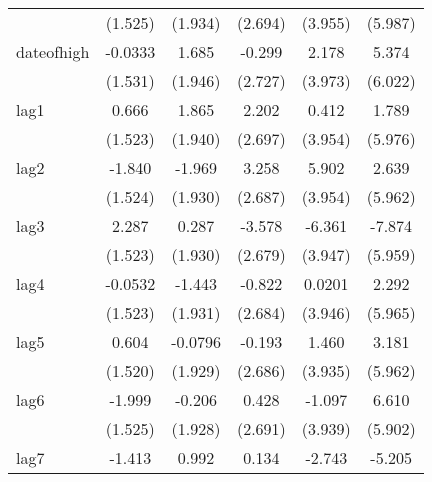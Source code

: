 {\begin{tabular}{l*{5}{c}}
            &     (1.525)         &     (1.934)         &     (2.694)         &     (3.955)         &     (5.987)         \\
[1em]
dateofhigh  &     -0.0333         &       1.685         &      -0.299         &       2.178         &       5.374         \\
            &     (1.531)         &     (1.946)         &     (2.727)         &     (3.973)         &     (6.022)         \\
[1em]
lag1        &       0.666         &       1.865         &       2.202         &       0.412         &       1.789         \\
            &     (1.523)         &     (1.940)         &     (2.697)         &     (3.954)         &     (5.976)         \\
[1em]
lag2        &      -1.840         &      -1.969         &       3.258         &       5.902         &       2.639         \\
            &     (1.524)         &     (1.930)         &     (2.687)         &     (3.954)         &     (5.962)         \\
[1em]
lag3        &       2.287         &       0.287         &      -3.578         &      -6.361         &      -7.874         \\
            &     (1.523)         &     (1.930)         &     (2.679)         &     (3.947)         &     (5.959)         \\
[1em]
lag4        &     -0.0532         &      -1.443         &      -0.822         &      0.0201         &       2.292         \\
            &     (1.523)         &     (1.931)         &     (2.684)         &     (3.946)         &     (5.965)         \\
[1em]
lag5        &       0.604         &     -0.0796         &      -0.193         &       1.460         &       3.181         \\
            &     (1.520)         &     (1.929)         &     (2.686)         &     (3.935)         &     (5.962)         \\
[1em]
lag6        &      -1.999         &      -0.206         &       0.428         &      -1.097         &       6.610         \\
            &     (1.525)         &     (1.928)         &     (2.691)         &     (3.939)         &     (5.902)         \\
[1em]
lag7        &      -1.413         &       0.992         &       0.134         &      -2.743         &      -5.205         \\

\end{tabular}}
